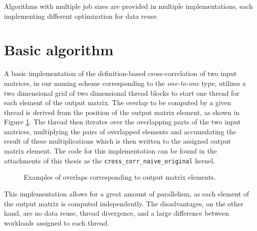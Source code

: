Algorithms with multiple job sizes are provided in multiple implementations, each implementing different optimization for data reuse.


\section{Basic algorithm}
\label{sec:basic_alg}



A basic implementation of the definition-based cross-correlation of two input matrices, in our naming scheme corresponding to the \textit{one-to-one} type, utilizes a two dimensional grid of two dimensional thread blocks to start one thread for each element of the output matrix. The overlap to be computed by a given thread is derived from the position of the output matrix element, as shown in Figure \ref{fig:basic_algorithm_overlaps}. The thread then iterates over the overlapping parts of the two input matrices, multiplying the pairs of overlapped elements and accumulating the result of these multiplications which is then written to the assigned output matrix element. The code for this implementation can be found in the attachments of this thesis as the \texttt{cross\_corr\_naive\_original} kernel.

\begin{figure}[ht]
	\fontsize{6}{8}\selectfont
	\centering
	\def\svgwidth{0.55\textwidth}
	
	\caption{Examples of overlaps corresponding to output matrix elements.}
	\label{fig:basic_algorithm_overlaps}
\end{figure}

This implementation allows for a great amount of parallelism, as each element of the output matrix is computed independently.
The disadvantages, on the other hand, are no data reuse, thread divergence, and a large difference between workloads assigned to each thread.


